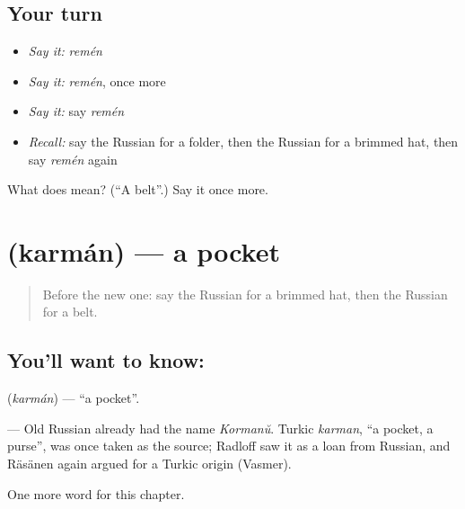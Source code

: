 \subsection*{Your turn}
\begin{itemize}
\raggedright
  \item \emph{Say it:} \emph{remén}
  \item \emph{Say it:} \emph{remén}, once more
  \item \emph{Say it:} say \emph{remén}
  \item \emph{Recall:} say the Russian for a folder, then the Russian for a brimmed hat, then say \emph{remén} again
\end{itemize}

\begin{tcolorbox}[breakable,colback=teal!4,colframe=teal!35!black,title={Before you move on}]
What does  mean? (\textquotedblleft{}A belt\textquotedblright{}.) Say it once more.
\end{tcolorbox}
\section[\texorpdfstring{\ru{карман} (karmán)}{карман (karmán)}]{ (karmán) — a pocket}

\label{lesson:RU-C193-karman}



\begin{quote}
Before the new one: say the Russian for a brimmed hat, then the Russian for a belt.
\end{quote}

\subsection*{You'll want to know: }
\textbf{} (\emph{karmán}) — \textquotedblleft{}a pocket\textquotedblright{}.

\begin{cousinweb}
\textbf{} — Old Russian already had the name \emph{Kormanŭ}. Turkic \emph{karman}, \textquotedblleft{}a pocket, a purse\textquotedblright{}, was once taken as the source; Radloff saw it as a loan from Russian, and Räsänen again argued for a Turkic origin (Vasmer).
\end{cousinweb}

\begin{grammarlens}[title={What you've built}]
One more word for this chapter.
\end{grammarlens}

